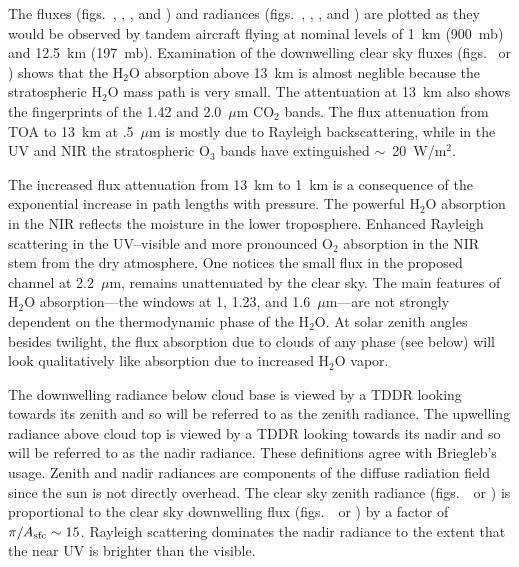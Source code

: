 The fluxes (figs.~, , , and \/) and
radiances (figs.~, , , and \/) are
plotted as they would be observed by tandem aircraft flying at nominal
levels of 1~km (900~mb) and 12.5~km (197~mb). 
Examination of the downwelling clear sky fluxes
(figs.~ or \/) shows
that the H$_2$O absorption above 13~km is almost neglible because the
stratospheric H$_2$O mass path is very small.
The attentuation at 13~km also shows the fingerprints of the 1.42 and
2.0~$\mu$m CO$_2$ bands.
The flux attenuation from TOA to 13~km at .5~$\mu$m is mostly due to
Rayleigh backscattering, while in the UV and NIR the stratospheric
O$_3$ bands have extinguished $\sim$~20~W/m$^2$.

The increased flux attenuation from 13~km to 1~km is a consequence of
the exponential increase in path lengths with pressure. 
The powerful H$_2$O absorption in the NIR reflects the moisture in the
lower troposphere. 
Enhanced Rayleigh scattering in the UV--visible and more pronounced
O$_2$ absorption in the NIR stem from the dry atmosphere.
One notices the small flux in the proposed channel at 2.2~$\mu$m, 
remains unattenuated by the clear sky.
The main features of H$_2$O absorption---the windows at 1, 1.23, and
1.6~$\mu$m---are not strongly dependent on the thermodynamic phase of
the H$_2$O. 
At solar zenith angles besides twilight, the flux absorption due to 
clouds of any phase (see below) will look qualitatively like
absorption due to increased H$_2$O vapor.

The downwelling radiance below cloud base is viewed by a TDDR
looking towards its zenith and so will be referred to as the zenith
radiance.
The upwelling radiance above cloud top is viewed by a TDDR
looking towards its nadir and so will be referred to as the nadir
radiance.
These definitions agree with Briegleb's usage.
Zenith and nadir radiances 
are components of the diffuse radiation field since the sun is not
directly overhead. 
The clear sky zenith radiance
(figs.~\ or \/)
is proportional to the clear sky downwelling flux 
(figs.~\ or \/)
by a factor of $\pi/A_{\rm sfc} \sim 15$.
Rayleigh scattering dominates the nadir radiance to the
extent that the near UV is brighter than the visible.

